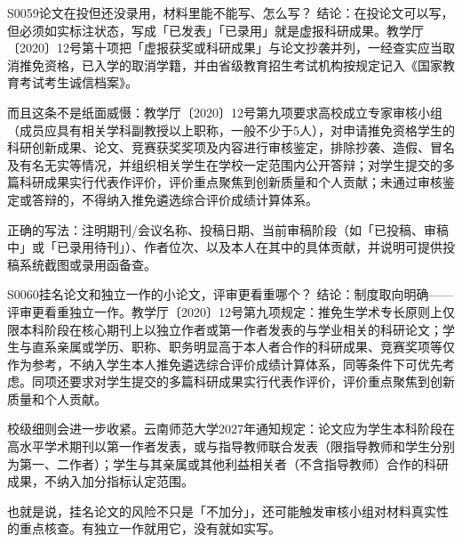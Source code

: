 \begin{qa}{S0059}{论文在投但还没录用，材料里能不能写、怎么写？}
结论：在投论文可以写，但必须如实标注状态，写成「已发表」「已录用」就是虚报科研成果。教学厅〔2020〕12号第十项把「虚报获奖或科研成果」与论文抄袭并列，一经查实应当取消推免资格，已入学的取消学籍，并由省级教育招生考试机构按规定记入《国家教育考试考生诚信档案》。

而且这条不是纸面威慑：教学厅〔2020〕12号第九项要求高校成立专家审核小组（成员应具有相关学科副教授以上职称，一般不少于5人），对申请推免资格学生的科研创新成果、论文、竞赛获奖奖项及内容进行审核鉴定，排除抄袭、造假、冒名及有名无实等情况，并组织相关学生在学校一定范围内公开答辩；对学生提交的多篇科研成果实行代表作评价，评价重点聚焦到创新质量和个人贡献；未通过审核鉴定或答辩的，不得纳入推免遴选综合评价成绩计算体系。

正确的写法：注明期刊/会议名称、投稿日期、当前审稿阶段（如「已投稿、审稿中」或「已录用待刊」）、作者位次、以及本人在其中的具体贡献，并说明可提供投稿系统截图或录用函备查。
\end{qa}

\begin{qa}{S0060}{挂名论文和独立一作的小论文，评审更看重哪个？}
结论：制度取向明确——评审更看重独立一作。教学厅〔2020〕12号第九项规定：推免生学术专长原则上仅限本科阶段在核心期刊上以独立作者或第一作者发表的与学业相关的科研论文；学生与直系亲属或学历、职称、职务明显高于本人者合作的科研成果、竞赛奖项等仅作为参考，不纳入学生本人推免遴选综合评价成绩计算体系，同等条件下可优先考虑。同项还要求对学生提交的多篇科研成果实行代表作评价，评价重点聚焦到创新质量和个人贡献。

校级细则会进一步收紧。云南师范大学2027年通知规定：论文应为学生本科阶段在高水平学术期刊以第一作者发表，或与指导教师联合发表（限指导教师和学生分别为第一、二作者）；学生与其亲属或其他利益相关者（不含指导教师）合作的科研成果，不纳入加分指标认定范围。

也就是说，挂名论文的风险不只是「不加分」，还可能触发审核小组对材料真实性的重点核查。有独立一作就用它，没有就如实写。
\end{qa}

